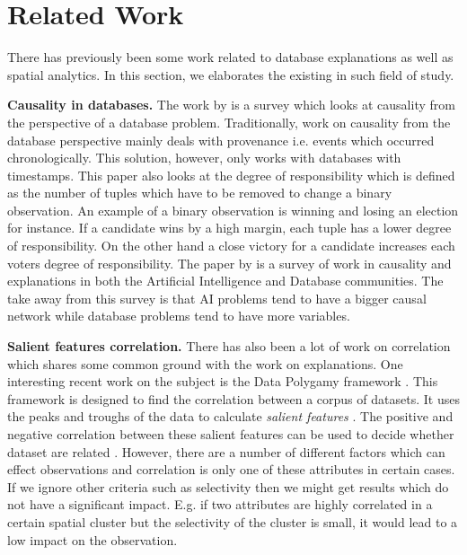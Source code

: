 \section{Related Work}
There has previously been some work related to database explanations as well as spatial analytics. 
In this section, we elaborates the existing in such field of study. 

{\bf Causality in databases.} The work by \cite{meliou2010causality} is a survey which looks at causality from the perspective of a database problem. Traditionally, work on causality from the database perspective mainly deals with provenance i.e. events which occurred chronologically. This solution, however, only works with databases with timestamps. This paper also looks at the degree of responsibility which is defined as the number of tuples which have to be removed to change a binary observation. An example of a binary observation is winning and losing an election for instance. If a candidate wins by a high margin, each tuple has a lower degree of responsibility. On the other hand a close victory for a candidate increases each voters degree of responsibility. The paper by \cite{meliou2014causality} is a survey of work in causality and explanations in both the Artificial Intelligence and Database communities. The take away from this survey is that AI problems tend to have a bigger causal network while database problems tend to have more variables.

{\bf Salient features correlation.} There has also been a lot of work on correlation which shares some common ground with the work on explanations. One interesting recent work on the subject is the Data Polygamy framework \cite{chirigati2016data}. This framework is designed to find the correlation between a corpus of datasets. It uses the peaks and troughs of the data to calculate \textit{salient features} \cite{dunn1986applied}. The positive and negative correlation between these salient features can be used to decide whether dataset are related \cite{su2014supporting}. 
However, there are a number of different factors which can effect observations and correlation is only one of these attributes in certain cases. 
If we ignore other criteria such as selectivity then we might get results which do not have a significant impact. E.g. if two attributes are highly correlated in a certain spatial cluster but the selectivity of the cluster is small, it would lead to a low impact on the observation.

